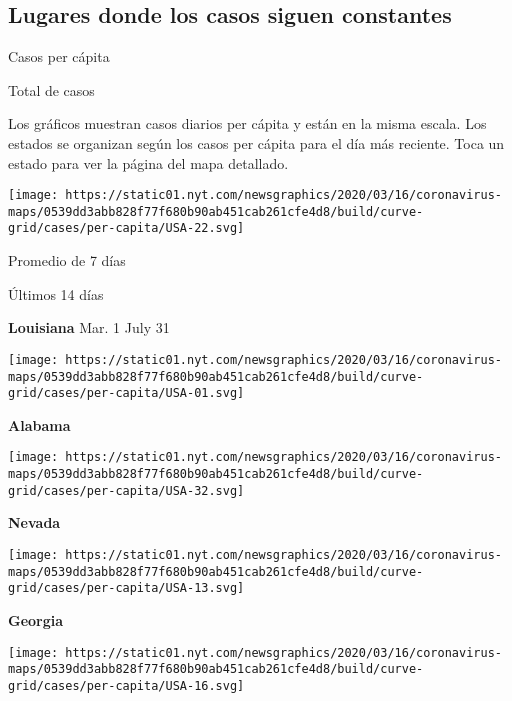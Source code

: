 \hypertarget{lugares-donde-los-casos-siguen-constantes}{%
\subsection{Lugares donde los casos siguen
constantes}\label{lugares-donde-los-casos-siguen-constantes}}

Casos per cápita

Total de casos

Los gráficos muestran casos diarios per cápita y están en la misma
escala. Los estados se organizan según los casos per cápita para el día
más reciente. Toca un estado para ver la página del mapa detallado.

\href{https://www.nytimes.com/interactive/2020/us/louisiana-coronavirus-cases.html}{}

\texttt{[image: https://static01.nyt.com/newsgraphics/2020/03/16/coronavirus-maps/0539dd3abb828f77f680b90ab451cab261cfe4d8/build/curve-grid/cases/per-capita/USA-22.svg]}

Promedio de 7 días

Últimos 14 días

\textbf{Louisiana} Mar. 1 July 31

\href{https://www.nytimes.com/interactive/2020/us/alabama-coronavirus-cases.html}{}

\texttt{[image: https://static01.nyt.com/newsgraphics/2020/03/16/coronavirus-maps/0539dd3abb828f77f680b90ab451cab261cfe4d8/build/curve-grid/cases/per-capita/USA-01.svg]}

\textbf{Alabama}

\href{https://www.nytimes.com/interactive/2020/us/nevada-coronavirus-cases.html}{}

\texttt{[image: https://static01.nyt.com/newsgraphics/2020/03/16/coronavirus-maps/0539dd3abb828f77f680b90ab451cab261cfe4d8/build/curve-grid/cases/per-capita/USA-32.svg]}

\textbf{Nevada}

\href{https://www.nytimes.com/interactive/2020/us/georgia-coronavirus-cases.html}{}

\texttt{[image: https://static01.nyt.com/newsgraphics/2020/03/16/coronavirus-maps/0539dd3abb828f77f680b90ab451cab261cfe4d8/build/curve-grid/cases/per-capita/USA-13.svg]}

\textbf{Georgia}

\href{https://www.nytimes.com/interactive/2020/us/idaho-coronavirus-cases.html}{}

\texttt{[image: https://static01.nyt.com/newsgraphics/2020/03/16/coronavirus-maps/0539dd3abb828f77f680b90ab451cab261cfe4d8/build/curve-grid/cases/per-capita/USA-16.svg]}

